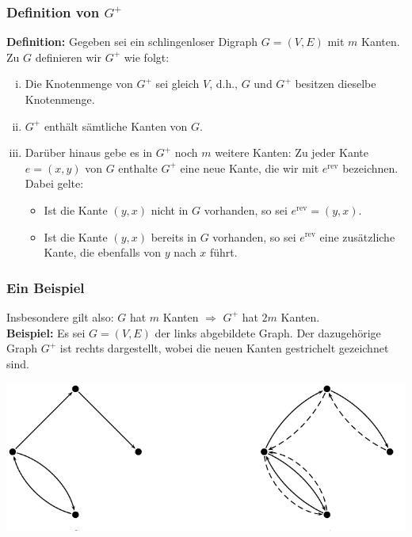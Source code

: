 \documentclass[smaller]{beamer}
\begin{document}
\begin{frame}
 \frametitle{Definition von $G^+$}
 \textbf{Definition:} Gegeben sei ein schlingenloser Digraph $G=(V,E)$ mit $m$ Kanten. Zu $G$ definieren wir $G^+$ wie folgt:
	\begin{enumerate}[i)]
		\item Die Knotenmenge von $G^+$ sei gleich $V$, d.h., $G$ und $G^+$ besitzen dieselbe Knotenmenge.
		
		\item $G^+$ enthält sämtliche Kanten von $G$.
		
		\item \alert{Darüber hinaus gebe es in $G^+$ noch $m$ weitere Kanten}: Zu jeder Kante $e=(x,y)$ von $G$ enthalte $G^+$ eine neue Kante, die wir mit $e^{\text{rev}}$ bezeichnen. Dabei gelte:
		\begin{itemize}
			\item Ist die Kante $(y,x)$ nicht in $G$ vorhanden, so sei $e^{\text{rev}} = (y,x)$.
			
			\item Ist die Kante $(y,x)$ bereits in $G$ vorhanden, so sei $e^{\text{rev}}$ eine zusätzliche Kante, die ebenfalls von $y$ nach $x$ führt. 
		\end{itemize}
	\end{enumerate}		
\end{frame}

\begin{frame}
 \frametitle{Ein Beispiel}
 Insbesondere gilt also: $G$ hat $m$ Kanten $\Rightarrow$ $G^+$ hat $2m$ Kanten. \\ \vspace*{0.2cm}
\textbf{Beispiel:} Es sei $G=(V,E)$ der links abgebildete Graph. Der dazugehörige Graph $G^+$ ist rechts dargestellt, wobei die neuen Kanten gestrichelt gezeichnet sind.

\begin{center}
	\includegraphics[scale=0.9]{fig65.pdf}
\end{center}
\end{frame}
\end{document}
